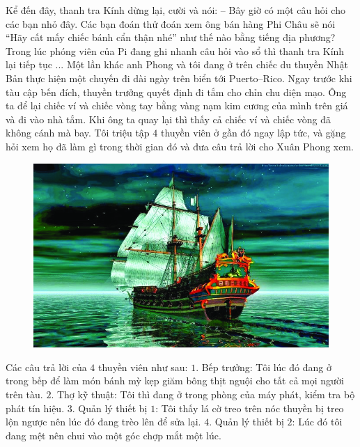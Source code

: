 	\vskip 0.1cm
	Kể đến đây, thanh tra Kính dừng lại, cười và nói:
	\vskip 0.1cm
	--	Bây giờ có một câu hỏi cho các bạn nhỏ đây. Các bạn đoán thử đoán xem ông bán hàng Phi Châu sẽ nói “Hãy cất mấy chiếc bánh cẩn thận nhé” như thế nào bằng tiếng địa phương? 
	\vskip 0.1cm
	Trong lúc phóng viên của Pi đang ghi nhanh câu hỏi vào sổ thì thanh tra Kính lại tiếp tục ...
	\vskip 0.1cm
	\textbf{\color{toancuabi}{Du hành trên đại dương}}
	\vskip 0.1cm
	Một lần khác anh Phong và tôi đang ở trên chiếc du thuyền Nhật Bản thực hiện một chuyến đi dài ngày trên biển tới Puerto--Rico. Ngay trước khi tàu cập bến đích, thuyền trưởng quyết định đi tắm cho chỉn chu diện mạo. Ông ta để lại chiếc ví và chiếc vòng tay bằng vàng nạm kim cương của mình trên giá và đi vào nhà tắm. Khi ông ta quay lại thì thấy cả chiếc ví và chiếc vòng đã không cánh mà bay. Tôi triệu tập $4$ thuyền viên ở gần đó ngay lập tức, và gặng hỏi xem họ đã làm gì trong thời gian đó và đưa câu trả lời cho Xuân Phong xem. 
		\begin{figure}[H]
			\centering
			\vspace*{-5pt}
			\captionsetup{labelformat= empty, justification=centering}
			\includegraphics[width=0.7\linewidth]{3}
			\vspace*{-10pt}
		\end{figure}
	Các câu trả lời của $4$ thuyền viên như sau: 
	\vskip 0.1cm
	$1.$ Bếp trưởng: Tôi lúc đó đang ở trong bếp để làm món bánh mỳ kẹp giăm bông thịt nguội cho tất cả mọi người trên tàu. 
	\vskip 0.1cm
	$2.$ Thợ kỹ thuật: Tôi thì đang ở trong phòng của máy phát, kiểm tra bộ phát tín hiệu. 
	\vskip 0.1cm
	$3.$ Quản lý thiết bị $1$: Tôi thấy lá cờ treo trên nóc thuyền bị treo lộn ngược nên lúc đó đang trèo lên để sửa lại. 
	\vskip 0.1cm
	$4.$ Quản lý thiết bị $2$: Lúc đó tôi đang mệt nên chui vào một góc  chợp mắt một lúc. 
